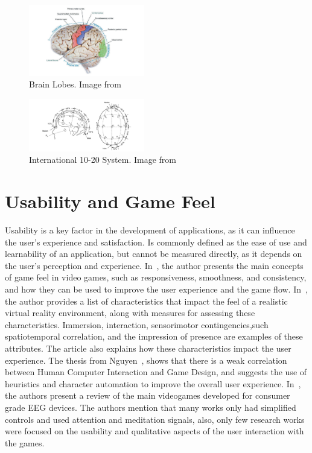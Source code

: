 \begin{figure}[htbp!]
    \centering
    \includegraphics[width=0.45\textwidth]{Figures/Related/brain_lobes}
    \caption{Brain Lobes. Image from~\cite{Harrison2015}}
\end{figure}
\begin{figure}[htbp!]
    \centering
    \includegraphics[width=0.45\textwidth]{Figures/Related/international_10_20_system}
    \caption{International 10-20 System. Image from~\cite{luis2012brain}}
\end{figure}
\section{Usability and Game Feel}
Usability is a key factor in the development of applications, as it can influence the user's experience and satisfaction.
Is commonly defined as the ease of use and learnability of an application, but cannot be measured directly, as it depends on the user's perception and experience.
In~\cite{swink2008game}, the author presents the main concepts of game feel in video games, such as responsiveness, smoothness, and consistency, and how they can be used to improve the user experience and the game flow.
In~\cite{perez2018virtual}, the author provides a list of characteristics that impact the feel of a realistic virtual reality environment, along with measures for assessing these characteristics.
Immersion, interaction, sensorimotor contingencies,such spatiotemporal correlation, and the impression of presence are examples of these attributes.
The article also explains how these characteristics impact the user experience. 
The thesis from Nguyen~\cite{nguyen2012human}, shows that there is a weak correlation between Human Computer Interaction and Game Design, and suggests the use of heuristics and character automation to improve the overall user experience.
In~\cite{doi:10.1080/10447318.2019.1612213}, the authors present a review of the main videogames developed for consumer grade EEG devices.
The authors mention that many works only had simplified controls and used attention and meditation signals, also, only few research works were focused on the usability and qualitative aspects of the user interaction with the games.

